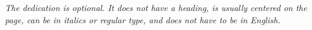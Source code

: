 

\vspace*{\fill}
\begin{flushleft}
\textit{The dedication is optional. It does not have a heading, is usually centered on the page, can be
in italics or regular type, and does not have to be in English.} %
\end{flushleft}
\vspace*{\fill}
\clearpage


